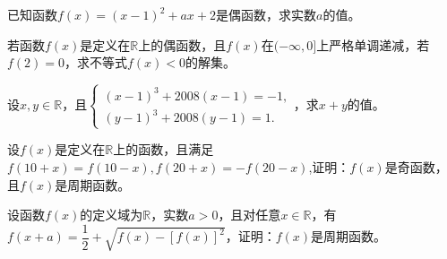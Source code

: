 \documentclass[lang=cn,math=cm,chinesefont=nofont,11pt,scheme=chinese,onecol]{elegantbook}
\begin{document}
\begin{exercise}\label{2017RJB_bx1_P111.B8}
  已知函数$f(x)=(x-1)^2+ax+2$是偶函数，求实数$a$的值。
\end{exercise}

\begin{exercise}\label{2017RJB_bx1_P111.C2}
  若函数$f(x)$是定义在$\mathbb{R}$上的偶函数，且$f(x)$在$(-\infty,0]$上严格单调递减，若$f(2)=0$，求不等式$f(x)<0$的解集。
\end{exercise}

\begin{exercise}\label{ASJC_G1_P30.11}
  设$x,y\in\mathbb{R}$，且$\begin{cases}(x-1)^3+2008(x-1)=-1,\\(y-1)^3+2008(y-1)=1.\end{cases}$，求$x+y$的值。
\end{exercise}

\begin{exercise}\label{HS2FZ_lkb1_P57.3}
  设$f(x)$是定义在$\mathbb{R}$上的函数，且满足$f(10+x)=f(10-x),f(20+x)=-f(20-x)$,证明：$f(x)$是奇函数，且$f(x)$是周期函数。
\end{exercise}

\begin{exercise}\label{HS2FZ_lkb1_P55.2}
  设函数$f(x)$的定义域为$\mathbb{R}$，实数$a>0$，且对任意$x\in\mathbb{R}$，有$f(x+a)=\dfrac{1}{2}+\sqrt{f(x)-[f(x)]^{2}}$，证明：$f(x)$是周期函数。
\end{exercise}
\end{document}
